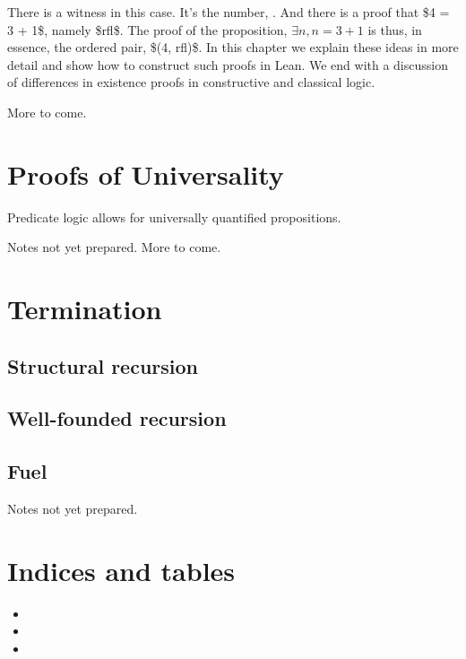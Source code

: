 \documentclass[letterpaper,10pt,english]{sphinxmanual}
\begin{document}
There is a witness in this case. It’s the number, . And there is a
proof that \$4 = 3 + 1\$, namely \$rfl\$. The proof of the proposition,
\(\exists n, n = 3 + 1\) is thus, in essence, the ordered pair,
\$(4, rfl)\$. In this chapter we explain these ideas in more detail and
show how to construct such proofs in Lean. We end with a discussion of
differences in existence proofs in constructive and classical logic.

More to come.


\chapter{Proofs of Universality}
\label{\detokenize{19-univeral:proofs-of-universality}}\label{\detokenize{19-univeral::doc}}
Predicate logic allows for universally quantified propositions.

Notes not yet prepared. More to come.


\chapter{Termination}
\label{\detokenize{20-termination:termination}}\label{\detokenize{20-termination::doc}}

\section{Structural recursion}
\label{\detokenize{20-termination:structural-recursion}}

\section{Well-founded recursion}
\label{\detokenize{20-termination:well-founded-recursion}}

\section{Fuel}
\label{\detokenize{20-termination:fuel}}
Notes not yet prepared.


\chapter{Indices and tables}
\label{\detokenize{index:indices-and-tables}}\begin{itemize}
\item {} 

\item {} 

\item {} 

\end{itemize}



\renewcommand{\indexname}{Index}
\printindex
\end{document}
